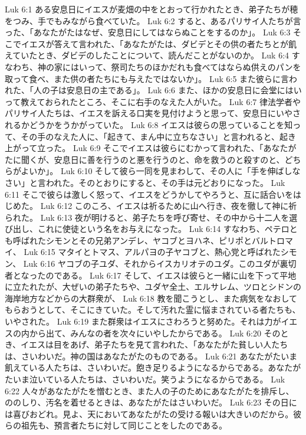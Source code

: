 Luk 6:1  ある安息日にイエスが麦畑の中をとおって行かれたとき、弟子たちが穂をつみ、手でもみながら食べていた。
Luk 6:2  すると、あるパリサイ人たちが言った、「あなたがたはなぜ、安息日にしてはならぬことをするのか」。
Luk 6:3  そこでイエスが答えて言われた、「あなたがたは、ダビデとその供の者たちとが飢えていたとき、ダビデのしたことについて、読んだことがないのか。
Luk 6:4  すなわち、神の家にはいって、祭司たちのほかだれも食べてはならぬ供えのパンを取って食べ、また供の者たちにも与えたではないか」。
Luk 6:5  また彼らに言われた、「人の子は安息日の主である」。
Luk 6:6  また、ほかの安息日に会堂にはいって教えておられたところ、そこに右手のなえた人がいた。
Luk 6:7  律法学者やパリサイ人たちは、イエスを訴える口実を見付けようと思って、安息日にいやされるかどうかをうかがっていた。
Luk 6:8  イエスは彼らの思っていることを知って、その手のなえた人に、「起きて、まん中に立ちなさい」と言われると、起き上がって立った。
Luk 6:9  そこでイエスは彼らにむかって言われた、「あなたがたに聞くが、安息日に善を行うのと悪を行うのと、命を救うのと殺すのと、どちらがよいか」。
Luk 6:10  そして彼ら一同を見まわして、その人に「手を伸ばしなさい」と言われた。そのとおりにすると、その手は元どおりになった。
Luk 6:11  そこで彼らは激しく怒って、イエスをどうかしてやろうと、互に話合いをはじめた。
Luk 6:12  このころ、イエスは祈るために山へ行き、夜を徹して神に祈られた。
Luk 6:13  夜が明けると、弟子たちを呼び寄せ、その中から十二人を選び出し、これに使徒という名をお与えになった。
Luk 6:14  すなわち、ペテロとも呼ばれたシモンとその兄弟アンデレ、ヤコブとヨハネ、ピリポとバルトロマイ、
Luk 6:15  マタイとトマス、アルパヨの子ヤコブと、熱心党と呼ばれたシモン、
Luk 6:16  ヤコブの子ユダ、それからイスカリオテのユダ。このユダが裏切者となったのである。
Luk 6:17  そして、イエスは彼らと一緒に山を下って平地に立たれたが、大ぜいの弟子たちや、ユダヤ全土、エルサレム、ツロとシドンの海岸地方などからの大群衆が、
Luk 6:18  教を聞こうとし、また病気をなおしてもらおうとして、そこにきていた。そして汚れた霊に悩まされている者たちも、いやされた。
Luk 6:19  また群衆はイエスにさわろうと努めた。それは力がイエスの内から出て、みんなの者を次々にいやしたからである。
Luk 6:20  そのとき、イエスは目をあげ、弟子たちを見て言われた、「あなたがた貧しい人たちは、さいわいだ。神の国はあなたがたのものである。
Luk 6:21  あなたがたいま飢えている人たちは、さいわいだ。飽き足りるようになるからである。あなたがたいま泣いている人たちは、さいわいだ。笑うようになるからである。
Luk 6:22  人々があなたがたを憎むとき、また人の子のためにあなたがたを排斥し、ののしり、汚名を着せるときは、あなたがたはさいわいだ。
Luk 6:23  その日には喜びおどれ。見よ、天においてあなたがたの受ける報いは大きいのだから。彼らの祖先も、預言者たちに対して同じことをしたのである。

